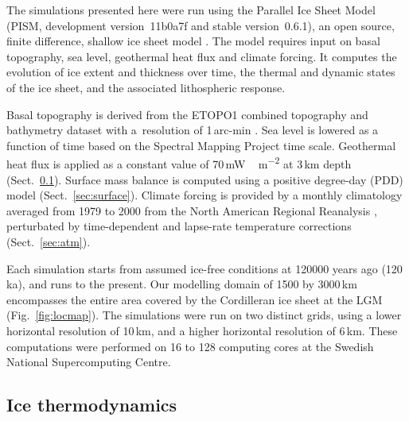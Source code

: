 \documentclass[tc]{copernicus}
\begin{document}
The simulations presented here were run using the Parallel Ice Sheet Model
(PISM, development version~11b0a7f and stable version~0.6.1), an open source,
finite difference, shallow ice sheet model \citep{PISM-authors.2014}. The model
requires input on basal topography, sea level, geothermal heat flux and
climate forcing. It computes the evolution of ice extent
and thickness over time, the thermal and dynamic
states of the ice sheet, and the associated lithospheric response.

Basal topography is derived from the ETOPO1 combined topography and bathymetry
dataset with a~resolution of 1\,arc-min \citep{Amante.Eakins.2009}. Sea level
is lowered as a function of time based on the Spectral Mapping Project
\citep[SPECMAP,][]{Imbrie.etal.1989} time scale. Geothermal heat flux
is applied as a constant value of 70\,\unit{mW\,m^{-2}} at 3\,km depth
(Sect.~\ref{sec:icedyn}). Surface mass balance is computed using a positive
degree-day (PDD) model (Sect.~\ref{sec:surface}). Climate forcing is
provided by a monthly climatology averaged from 1979 to 2000 from the North
American Regional Reanalysis \citep[NARR,][]{Mesinger.etal.2006},
perturbated by time-dependent and
lapse-rate temperature corrections (Sect.~\ref{sec:atm}).

Each simulation starts from assumed ice-free conditions at 120000 years ago
(120\,ka), and runs to the present. Our modelling domain of 1500 by 3000\,km
encompasses the entire area covered by the Cordilleran ice sheet at the LGM
(Fig.~\ref{fig:locmap}). The simulations were run on two distinct grids, using
a lower horizontal resolution of 10\,km, and a higher horizontal resolution of
6\,km. These computations were performed on 16 to 128 computing cores at the
Swedish National Supercomputing Centre.

\subsection{Ice thermodynamics}
\label{sec:icedyn}
\end{document}
